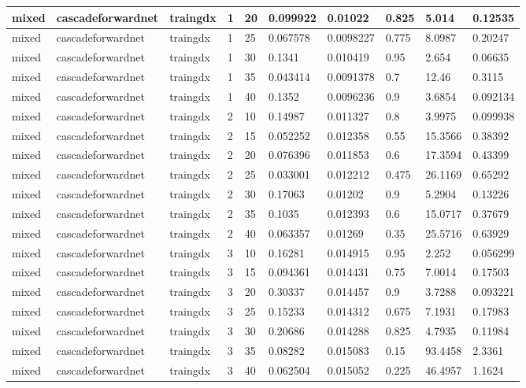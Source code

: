 \begin{longtable}{lllllllll}
mixed & cascadeforwardnet & traingdx & 1 & 20 & 0.099922 & 0.01022 & 0.825 & 5.014 & 0.12535 \\ \hline 
mixed & cascadeforwardnet & traingdx & 1 & 25 & 0.067578 & 0.0098227 & 0.775 & 8.0987 & 0.20247 \\ \hline 
mixed & cascadeforwardnet & traingdx & 1 & 30 & 0.1341 & 0.010419 & 0.95 & 2.654 & 0.06635 \\ \hline 
mixed & cascadeforwardnet & traingdx & 1 & 35 & 0.043414 & 0.0091378 & 0.7 & 12.46 & 0.3115 \\ \hline 
mixed & cascadeforwardnet & traingdx & 1 & 40 & 0.1352 & 0.0096236 & 0.9 & 3.6854 & 0.092134 \\ \hline 
mixed & cascadeforwardnet & traingdx & 2 & 10 & 0.14987 & 0.011327 & 0.8 & 3.9975 & 0.099938 \\ \hline 
mixed & cascadeforwardnet & traingdx & 2 & 15 & 0.052252 & 0.012358 & 0.55 & 15.3566 & 0.38392 \\ \hline 
mixed & cascadeforwardnet & traingdx & 2 & 20 & 0.076396 & 0.011853 & 0.6 & 17.3594 & 0.43399 \\ \hline 
mixed & cascadeforwardnet & traingdx & 2 & 25 & 0.033001 & 0.012212 & 0.475 & 26.1169 & 0.65292 \\ \hline 
mixed & cascadeforwardnet & traingdx & 2 & 30 & 0.17063 & 0.01202 & 0.9 & 5.2904 & 0.13226 \\ \hline 
mixed & cascadeforwardnet & traingdx & 2 & 35 & 0.1035 & 0.012393 & 0.6 & 15.0717 & 0.37679 \\ \hline 
mixed & cascadeforwardnet & traingdx & 2 & 40 & 0.063357 & 0.01269 & 0.35 & 25.5716 & 0.63929 \\ \hline 
mixed & cascadeforwardnet & traingdx & 3 & 10 & 0.16281 & 0.014915 & 0.95 & 2.252 & 0.056299 \\ \hline 
mixed & cascadeforwardnet & traingdx & 3 & 15 & 0.094361 & 0.014431 & 0.75 & 7.0014 & 0.17503 \\ \hline 
mixed & cascadeforwardnet & traingdx & 3 & 20 & 0.30337 & 0.014457 & 0.9 & 3.7288 & 0.093221 \\ \hline 
mixed & cascadeforwardnet & traingdx & 3 & 25 & 0.15233 & 0.014312 & 0.675 & 7.1931 & 0.17983 \\ \hline 
mixed & cascadeforwardnet & traingdx & 3 & 30 & 0.20686 & 0.014288 & 0.825 & 4.7935 & 0.11984 \\ \hline 
mixed & cascadeforwardnet & traingdx & 3 & 35 & 0.08282 & 0.015083 & 0.15 & 93.4458 & 2.3361 \\ \hline 
mixed & cascadeforwardnet & traingdx & 3 & 40 & 0.062504 & 0.015052 & 0.225 & 46.4957 & 1.1624 \\ \hline 

\end{longtable}
